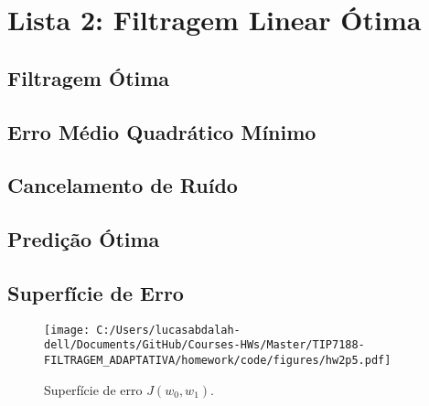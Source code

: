\section{Lista 2: Filtragem Linear Ótima}

\subsection{Filtragem Ótima}

\subsection{Erro Médio Quadrático Mínimo}

\subsection{Cancelamento de Ruído}

\subsection{Predição Ótima}

\subsection{Superfície de Erro}

\begin{figure}[!htb]
    \centering
    \texttt{[image: C:/Users/lucasabdalah-dell/Documents/GitHub/Courses-HWs/Master/TIP7188-FILTRAGEM\_ADAPTATIVA/homework/code/figures/hw2p5.pdf]}
    \caption{Superfície de erro $J(w_{0}, w_{1})$.}
    \label{fig:hw2p5}
\end{figure}
